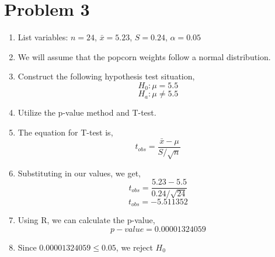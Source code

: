 \documentclass{article}
\begin{document}
\section*{Problem 3}
	\begin{enumerate}
		\item List variables: 
			$n = 24$, $\bar{x} = 5.23$, $S = 0.24$, $\alpha = 0.05$
		\item We will assume that the popcorn weights follow a normal distribution.
		\item Construct the following hypothesis test situation,
			\[H_0: \mu = 5.5\]
			\[H_a: \mu \neq 5.5\]
		\item Utilize the p-value method and T-test.
		\item The equation for T-test is,
			\[t_{obs} = \frac{\bar{x}-\mu}{S/\sqrt{n}}\]
		\item Substituting in our values, we get,
			\[t_{obs} = \frac{5.23-5.5}{0.24/\sqrt{24}}\]
			\[t_{obs} = -5.511352\]
		\item Using R, we can calculate the p-value,
			\[p-value = 0.00001324059\]
		\item Since $0.00001324059 \leq 0.05$, we reject $H_0$
		
	\end{enumerate}
			
\end{document}
